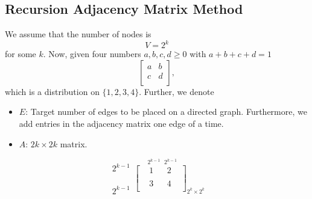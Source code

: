 \subsection{Recursion Adjacency Matrix Method}
We assume that the number of nodes is
\[
	V = 2^k
\]
for some \(k\). Now, given four numbers \(a, b, c, d \geq 0\) with \(a+b+c+d = 1\)
\[
	\begin{bmatrix}
		a & b \\
		c & d \\
	\end{bmatrix},
\]
which is a distribution on \(\{1, 2, 3, 4\}\). Further, we denote
\begin{itemize}
	\item \(E\): Target number of edges to be placed on a directed graph. Furthermore, we add entries in the adjacency matrix one edge of a time.
	\item \(A\): \(2k \times 2k\) matrix.
\end{itemize}
\[
	\substack{2^{k - 1}\\ \\ \\ \\ 2^{k-1}} \overset{\ \ \ 2^{k - 1}\ \ \ 2^{k-1}}{\begin{bmatrix}
			 & 1 &  & 2 & \\
			 &   &  &   & \\
			 & 3 &  & 4 & \\
		\end{bmatrix}}_{2^k\times 2^k}
\]

